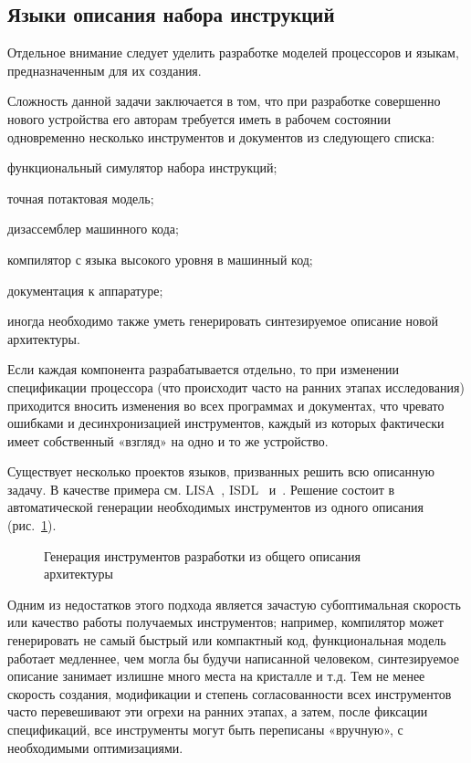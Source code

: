 \subsection{Языки описания набора инструкций}

Отдельное внимание следует уделить разработке моделей процессоров и языкам, предназначенным для их создания.

Сложность данной задачи заключается в том, что при разработке совершенно нового устройства его авторам требуется иметь в рабочем состоянии одновременно  несколько инструментов и документов из следующего списка:

\begin{itemize*}
\item функциональный симулятор набора инструкций;
\item точная потактовая модель;
\item дизассемблер машинного кода;
\item компилятор с языка высокого уровня в машинный код;
\item документация к аппаратуре;
\item иногда необходимо также уметь генерировать синтезируемое описание новой архитектуры.
\end{itemize*}

Если каждая компонента разрабатывается отдельно, то при изменении спецификации процессора (что происходит часто на ранних этапах исследования) приходится вносить изменения во всех программах и документах, что чревато ошибками и десинхронизацией инструментов, каждый из которых фактически имеет собственный «взгляд» на одно и то же устройство.  

Существует несколько проектов языков, призванных решить всю описанную задачу. В качестве примера см. LISA~\cite{wahlen2004c,zivojnovic1996,schliebusch2002}, ISDL~\cite{Hadjiyiannis97isdl:an,isdl1997} и~\cite{hoffmann2001}. Решение состоит в автоматической генерации необходимых инструментов из одного описания (рис.~\ref{fig:lisa}). 

\begin{figure}[htb]
    \centering
    \caption{Генерация инструментов разработки из общего описания архитектуры}
    \label{fig:lisa}
\end{figure}


Одним из недостатков этого подхода является зачастую субоптимальная скорость или качество работы получаемых инструментов; например, компилятор может генерировать не самый быстрый или компактный код, функциональная модель работает медленнее, чем могла бы будучи написанной человеком, синтезируемое описание занимает излишне много места на кристалле и т.д. Тем не менее скорость создания, модификации и степень согласованности всех инструментов часто перевешивают эти огрехи на ранних этапах, а затем, после фиксации спецификаций, все инструменты могут быть переписаны «вручную», с необходимыми оптимизациями.

